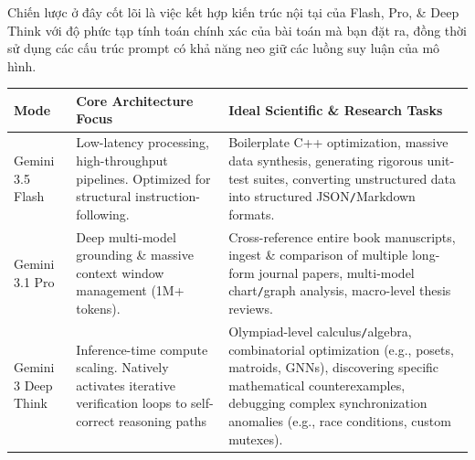 \documentclass{article}
\begin{document}
Chiến lược ở đây cốt lõi là việc kết hợp kiến trúc nội tại của {\sf Flash, Pro}, \& {\sf Deep Think} với độ phức tạp tính toán chính xác của bài toán mà bạn đặt ra, đồng thời sử dụng các cấu trúc prompt có khả năng neo giữ các luồng suy luận của mô hình.
\begin{table}[H]
	\centering
	\begin{tabular}{|p{2cm}|p{5.5cm}|p{10cm}|}
		\hline
		\textbf{Mode} & \textbf{Core Architecture Focus} & \textbf{Ideal Scientific \& Research Tasks} \\
		\hline
		Gemini 3.5 Flash & Low-latency processing, high-throughput pipelines. Optimized for structural instruction-following. & Boilerplate C++ optimization, massive data synthesis, generating rigorous unit-test suites, converting unstructured data into structured JSON{\tt/}Markdown formats. \\
		\hline
		Gemini 3.1 Pro & Deep multi-model grounding \& massive context window management (1M+ tokens). & Cross-reference entire book manuscripts, ingest \& comparison of multiple long-form journal papers, multi-model chart{\tt/}graph analysis, macro-level thesis reviews. \\
		\hline
		Gemini 3 Deep Think & Inference-time compute scaling. Natively activates iterative verification loops to self-correct reasoning paths & Olympiad-level calculus{\tt/}algebra, combinatorial optimization (e.g., posets, matroids, GNNs), discovering specific mathematical counterexamples, debugging complex synchronization anomalies (e.g., race conditions, custom mutexes). \\
		\hline
	\end{tabular}
\end{table}
\end{document}
